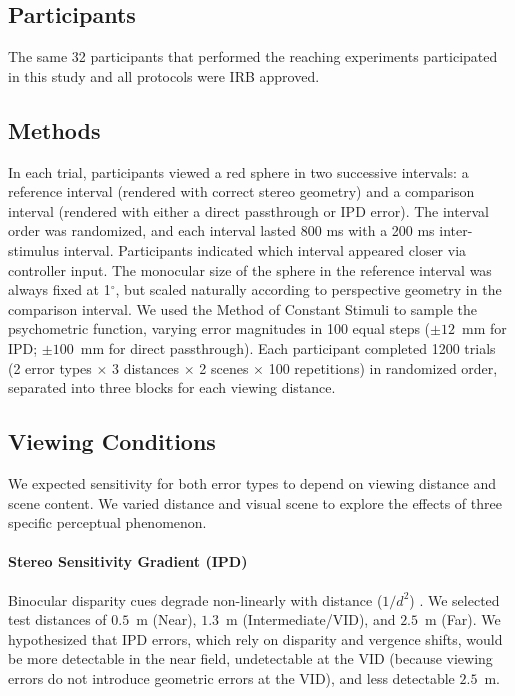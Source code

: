 \subsection{Participants}
The same 32 participants that performed the reaching experiments participated in this study and all protocols were IRB approved.

\subsection{Methods}
In each trial, participants viewed a red sphere in two successive intervals: a reference interval (rendered with correct stereo geometry) and a comparison interval (rendered with either a direct passthrough or IPD error). The interval order was randomized, and each interval lasted 800 ms with a 200 ms inter-stimulus interval. Participants indicated which interval appeared closer via controller input. The monocular size of the sphere in the reference interval was always fixed at 1$^\circ$, but scaled naturally according to perspective geometry in the comparison interval. We used the Method of Constant Stimuli to sample the psychometric function, varying error magnitudes in 100 equal steps ($\pm 12$~mm for IPD; $\pm 100$~mm for direct passthrough). Each participant completed 1200 trials (2 error types $\times$ 3 distances $\times$ 2 scenes $\times$ 100 repetitions) in randomized order, separated into three blocks for each viewing distance.

\subsection{Viewing Conditions}
We expected sensitivity for both error types to depend on viewing distance and scene content. We varied distance and visual scene to explore the effects of three specific perceptual phenomenon.

    \paragraph{Stereo Sensitivity Gradient (IPD)} Binocular disparity cues degrade non-linearly with distance ($1/d^2$) \cite{howard2012perceiving}. We selected test distances of $0.5$~m (Near), $1.3$~m (Intermediate/VID), and $2.5$~m (Far). We hypothesized that IPD errors, which rely on disparity and vergence shifts, would be more detectable in the near field, undetectable at the VID (because viewing errors do not introduce geometric errors at the VID), and less detectable $2.5$~m.
